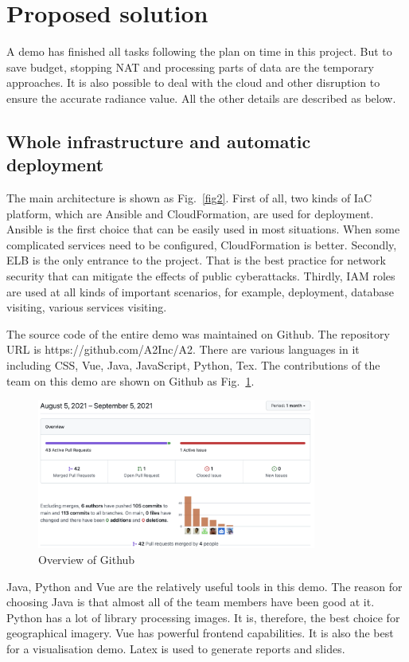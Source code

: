 \documentclass[conference]{IEEEtran}
\begin{document}
\section{Proposed solution}

A demo has finished all tasks following the plan on time in this project. But to save budget, stopping NAT and processing parts of data are 
the temporary approaches. It is also possible to deal with the cloud and other disruption to ensure the accurate radiance value. All the 
other details are described as below.

\subsection{Whole infrastructure and automatic deployment}

The main architecture is shown as Fig.~\ref{fig2}. First of all, two kinds of IaC platform, which are Ansible and CloudFormation, are used for deployment.
Ansible is the first choice that can be easily used in most situations. When some complicated services need to be configured, CloudFormation is 
better. Secondly, ELB is the only entrance to the project. That is the best practice for network security that can mitigate the effects 
of public cyberattacks. Thirdly, IAM roles are used at all kinds of important scenarios, for example, deployment, database visiting, various services visiting.

The source code of the entire demo was maintained on Github. The repository URL is https://github.com/A2Inc/A2. There are various languages in it including 
CSS, Vue, Java, JavaScript, Python, Tex. The contributions of the team on this demo are shown on Github as Fig.~\ref{fig3}.

\begin{figure}[htbp]
    \centerline{\includegraphics[width=260pt]{images/github.png}}
    \caption{Overview of Github}
    \label{fig3}
\end{figure}

Java, Python and Vue are the relatively useful tools in this demo. The reason for choosing Java is that almost all of the team members have been good at it. Python 
has a lot of library processing images. It is, therefore, the best choice for geographical imagery. Vue has powerful frontend capabilities. It is also the best for a 
visualisation demo. Latex is used to generate reports and slides.
\end{document}
